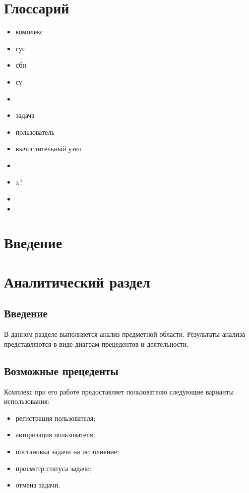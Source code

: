\documentclass[a4paper,12pt]{report}
\date{\today}
\numberwithin{equation}{section}
\begin{document}
\tableofcontents

\clearpage
\section*{Глоссарий}
\begin{itemize}
  \item комплекс
  \item сус
  \item сбн
  \item су  
  \item 
  \item задача
  \item пользователь
  \item вычислительный узел
  \item 
  \item x?
  \item 
  \item 
\end{itemize}

\clearpage
\section*{Введение}

\clearpage
\section{Аналитический раздел}
\subsection{Введение}
В данном разделе выполняется анализ предметной области.
Результаты анализа представляются в виде диаграм прецедентов и деятельности.

\subsection{Возможные прецеденты}
Комплекс при его работе предоставляет пользователю следующие варианты использования:
\begin{itemize}
  \item регистрация пользователя;
  \item авторизация пользователя;
  \item постановка задачи на исполнение;
  \item просмотр статуса задачи;
  \item отмена задачи.
\end{itemize}
\end{document}
